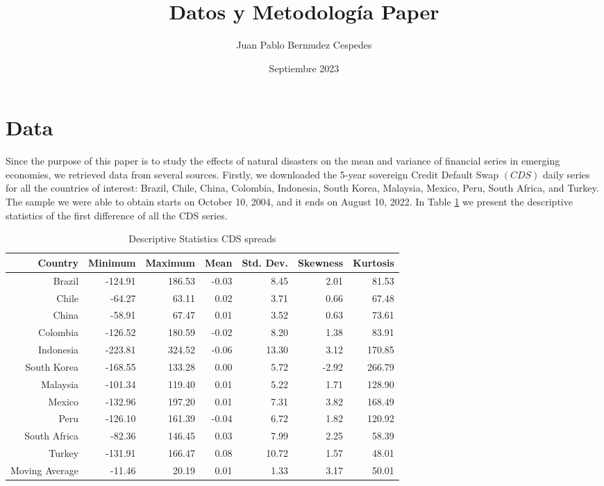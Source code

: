 \documentclass{article}
\title{Datos y Metodología Paper}
\author{Juan Pablo Bermudez Cespedes}
\date{Septiembre 2023}
\begin{document}
\maketitle

\section{Data}
Since the purpose of this paper is to study the effects of natural disasters on the mean and variance 
of financial series in emerging economies, we retrieved data from several sources. Firstly, we 
downloaded the 5-year sovereign Credit Default Swap $(CDS)$ daily series for all the countries of 
interest: Brazil, Chile, China, Colombia, Indonesia, South Korea, Malaysia, Mexico, Peru, South Africa, and Turkey. 
The sample we were able to obtain starts on October 10, 2004, and it ends on August 10, 2022. In Table \ref{table:CDS}
 we present the descriptive statistics of the first difference of all the CDS series. \\
\begin{table}[H]
\centering
\small
\begin{tabular}{rrrrrrr}
  \hline
Country & Minimum & Maximum & Mean & Std. Dev. & Skewness & Kurtosis \\ 
  \hline
Brazil & -124.91 & 186.53 & -0.03 & 8.45 & 2.01 & 81.53 \\ 
  Chile & -64.27 & 63.11 & 0.02 & 3.71 & 0.66 & 67.48 \\ 
  China & -58.91 & 67.47 & 0.01 & 3.52 & 0.63 & 73.61 \\ 
  Colombia & -126.52 & 180.59 & -0.02 & 8.20 & 1.38 & 83.91 \\ 
  Indonesia & -223.81 & 324.52 & -0.06 & 13.30 & 3.12 & 170.85 \\ 
  South Korea & -168.55 & 133.28 & 0.00 & 5.72 & -2.92 & 266.79 \\ 
  Malaysia & -101.34 & 119.40 & 0.01 & 5.22 & 1.71 & 128.90 \\ 
  Mexico & -132.96 & 197.20 & 0.01 & 7.31 & 3.82 & 168.49 \\ 
  Peru & -126.10 & 161.39 & -0.04 & 6.72 & 1.82 & 120.92 \\ 
  South Africa & -82.36 & 146.45 & 0.03 & 7.99 & 2.25 & 58.39 \\ 
  Turkey & -131.91 & 166.47 & 0.08 & 10.72 & 1.57 & 48.01 \\ 
  Moving Average & -11.46 & 20.19 & 0.01 & 1.33 & 3.17 & 50.01 \\ 
   \hline
\end{tabular}
\caption{Descriptive Statistics CDS spreads}
\label{table:CDS}
\end{table}
\end{document}
